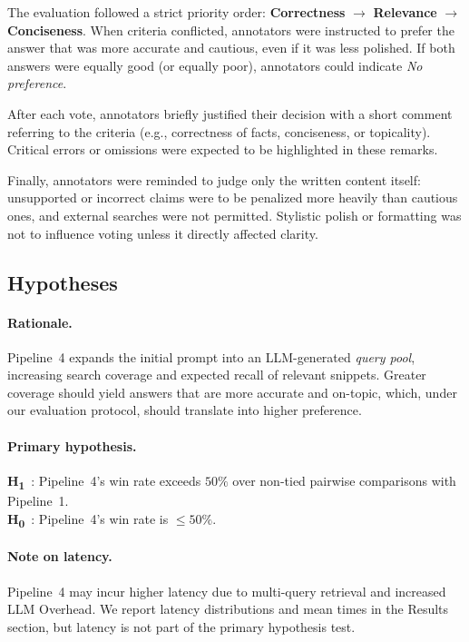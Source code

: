 \documentclass[manuscript,screen]{acmart}
\begin{document}
\begin{CCSXML}
	The evaluation followed a strict priority order:
	\textbf{Correctness} $\rightarrow$ \textbf{Relevance} $\rightarrow$
	\textbf{Conciseness}. When criteria conflicted, annotators were instructed to
	prefer the answer that was more accurate and cautious, even if it was less
	polished. If both answers were equally good (or equally poor), annotators could
	indicate \emph{No preference}.
	
	After each vote, annotators briefly justified their decision with a short
	comment referring to the criteria (e.g., correctness of facts, conciseness, or
	topicality). Critical errors or omissions were expected to be highlighted in
	these remarks.
	
	Finally, annotators were reminded to judge only the written content itself:
	unsupported or incorrect claims were to be penalized more heavily than cautious
	ones, and external searches were not permitted. Stylistic polish or formatting
	was not to influence voting unless it directly affected clarity.

	
	\subsection{Hypotheses}
	\label{subsec:hypotheses}

	\paragraph{Rationale.}
	Pipeline~4 expands the initial prompt into an LLM-generated \emph{query pool}, increasing search coverage and expected recall of relevant snippets. Greater coverage should yield answers that are more accurate and on-topic, which, under our evaluation protocol, should translate into higher preference.
	
	\paragraph{Primary hypothesis.}
	\textbf{H\textsubscript{1}}~\label{hyp:H1}: Pipeline~4’s win rate exceeds $50\%$ over non-tied pairwise comparisons with Pipeline~1.\\
	\textbf{H\textsubscript{0}}~\label{hyp:H0}: Pipeline~4’s win rate is $\leq 50\%$.
	
	\paragraph{Note on latency.}
	Pipeline~4 may incur higher latency due to multi-query retrieval and increased LLM Overhead. We report latency distributions and mean times in the Results section, but latency is not part of the primary hypothesis test.



\end{CCSXML}
\end{document}
